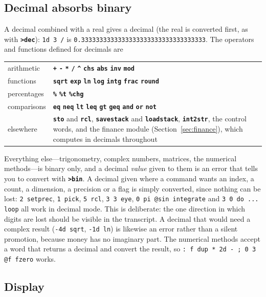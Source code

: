 \documentclass[11pt,letterpaper]{article}
\newcommand{\code}[1]{\texttt{#1}}
\newcommand{\cmd}[1]{\texttt{\textbf{#1}}}
\begin{document}
\subsection{Decimal absorbs binary}

A decimal combined with a real gives a decimal (the real is converted first, as with \cmd{>dec}): \code{1d 3 /} is \code{0.3333333333333333333333333333333333}. The operators and functions defined for decimals are
\begin{center}
\begin{tabular}{@{}lp{}@{}}
\toprule
arithmetic & \cmd{+} \cmd{-} \cmd{*} \cmd{/} \cmd{\textasciicircum} \cmd{chs} \cmd{abs} \cmd{inv} \cmd{mod} \\
functions & \cmd{sqrt} \cmd{exp} \cmd{ln} \cmd{log} \cmd{intg} \cmd{frac} \cmd{round} \\
percentages & \cmd{\%} \cmd{\%t} \cmd{\%chg} \\
comparisons & \cmd{eq} \cmd{neq} \cmd{lt} \cmd{leq} \cmd{gt} \cmd{geq} \cmd{and} \cmd{or} \cmd{not} \\
elsewhere & \cmd{sto} and \cmd{rcl}, \cmd{savestack} and \cmd{loadstack}, \cmd{int2str}, the control words, and the finance module (Section~\ref{sec:finance}), which computes in decimals throughout \\
\bottomrule
\end{tabular}
\end{center}
Everything else---trigonometry, complex numbers, matrices, the numerical methods---is binary only, and a decimal \emph{value} given to them is an error that tells you to convert with \cmd{>bin}. A decimal given where a command wants an index, a count, a dimension, a precision or a flag is simply converted, since nothing can be lost: \code{2 setprec}, \code{1 pick}, \code{5 rcl}, \code{3 3 eye}, \code{0 pi @sin integrate} and \code{3 0 do ... loop} all work in decimal mode. This is deliberate: the one direction in which digits are lost should be visible in the transcript. A decimal that would need a complex result (\code{-4d sqrt}, \code{-1d ln}) is likewise an error rather than a silent promotion, because money has no imaginary part. The numerical methods accept a word that returns a decimal and convert the result, so \code{: f dup * 2d - ; 0 3 @f fzero} works.

\subsection{Display}
\end{document}
